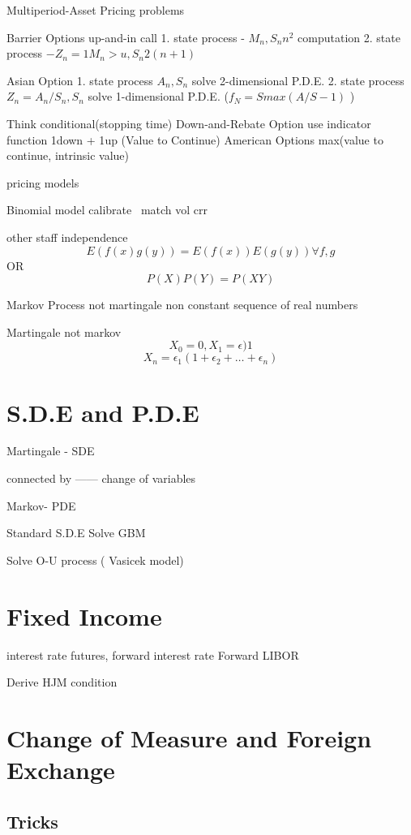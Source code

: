 \documentclass[11pt, openany]{book}              %
\begin{document}
Multiperiod-Asset Pricing problems

  Barrier Options
   up-and-in call
	1. state process - $M_n, S_n n^2$ computation
         2. state process $-Z_n = 1{M_n > u}, S_n  2(n+1)$

   Asian Option
       1. state process $A_n, S_n$ solve 2-dimensional P.D.E.
       2. state process $Z_n = A_n/S_n, S_n$ solve 1-dimensional P.D.E. ($f_N = S max( A/S - 1)$ ) 


   Think conditional(stopping time)
    Down-and-Rebate Option
      use indicator function 1{down} + 1{up} (Value to Continue)
    American Options max(value to continue, intrinsic value) 



pricing models

Binomial model 
calibrate 
 match vol crr 


other staff
independence 
$$E(f(x) g(y)) =  E(f(x)) E(g(y)) \forall f,g$$
OR
$$P( X ) P( Y ) = P(X Y)$$



Markov Process not martingale
   non constant sequence of real numbers

Martingale not markov
    $$X_0 = 0, X_1 = \epsilon)1$$
    $$X_n = \epsilon_1 ( 1+ \epsilon_2 +…+ \epsilon_n)$$



\chapter{S.D.E and P.D.E}

Martingale - SDE 

connected by —— change of variables 

Markov- PDE


Standard S.D.E
Solve GBM

Solve O-U process ( Vasicek model)

\chapter{Fixed Income}

interest rate futures, forward interest rate
Forward LIBOR

Derive HJM condition

\chapter{Change of Measure and Foreign Exchange}


\section{ Tricks}
\end{document}
